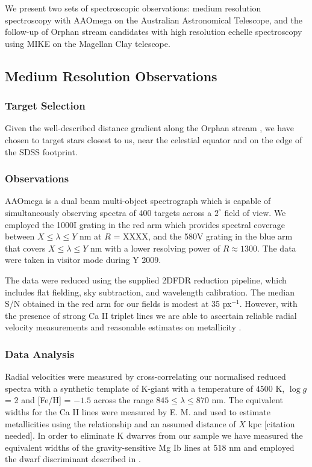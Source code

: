 We present two sets of spectroscopic observations: medium resolution spectroscopy with AAOmega on the Australian Astronomical Telescope, and the follow-up of Orphan stream candidates with high resolution echelle spectroscopy using MIKE on the Magellan Clay telescope. 

\subsection{Medium Resolution Observations}

\subsubsection{Target Selection}
Given the well-described distance gradient along the Orphan stream \citep{Belokurov;et-al_2007,Newberg;et-al_2010}, we have chosen to target stars closest to us, near the celestial equator and on the edge of the SDSS footprint.


\subsubsection{Observations}
AAOmega is a dual beam multi-object spectrograph which is capable of simultaneously observing spectra of 400 targets across a $2^\circ$ field of view. We employed the 1000I grating in the red arm which provides spectral coverage between $X \leq \lambda \leq Y$ nm at $R$ = XXXX, and the 580V grating in the blue arm that covers $X \leq \lambda \leq Y$ nm with a lower resolving power of $R \approx 1300$. The data were taken in visitor mode during Y 2009. 

The data were reduced using the supplied \textsc{2DFDR} reduction pipeline, which includes flat fielding, sky subtraction, and wavelength calibration. The median S/N obtained in the red arm for our fields is modest at 35 px$^{-1}$. However, with the presence of strong Ca \textsc{II} triplet lines we are able to ascertain reliable radial velocity measurements and reasonable estimates on metallicity \citep[][and references therein]{Starkenburg;et-al_2010}. 

\subsubsection{Data Analysis}

Radial velocities were measured by cross-correlating our normalised reduced spectra with a synthetic template of K-giant with a temperature of $4500$ K, $\log{g}$ = 2 and [Fe/H] = $-1.5$ across the range $845 \leq \lambda \leq 870$ nm. The equivalent widths for the Ca \textsc{II} lines were measured by E. M. and used to estimate metallicities using the \citet{Battaglia;et-al_2008} relationship and an assumed distance of $X$ kpc [citation needed]. In order to eliminate K dwarves from our sample we have measured the equivalent widths of the gravity-sensitive Mg \textsc{I}b lines at $518$ nm and employed the dwarf discriminant described in \citet{Casey;et-al_2012}.


